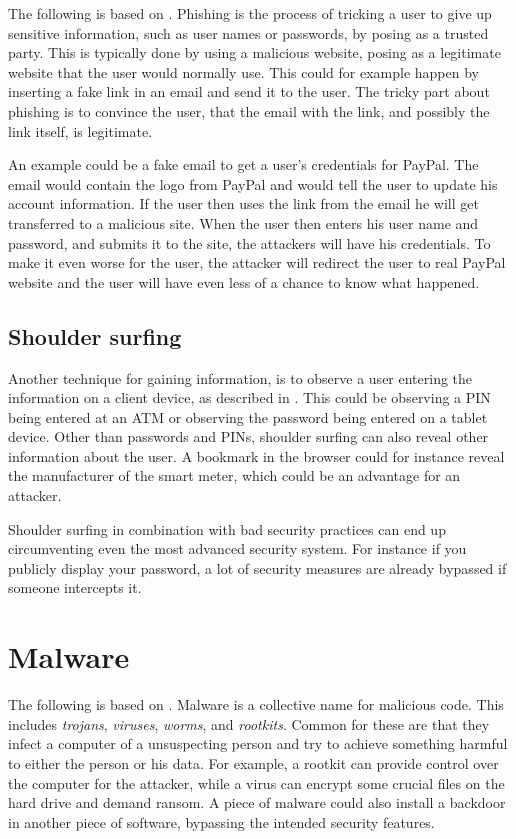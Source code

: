 The following is based on \citet{security_engineering_ross_anderson,dhamija2006phishing}.
Phishing is the process of tricking a user to give up sensitive information, such as user names or passwords, by posing as a trusted party.
This is typically done by using a malicious website, posing as a legitimate website that the user would normally use.
This could for example happen by inserting a fake link in an email and send it to the user.
The tricky part about phishing is to convince the user, that the email with the link, and possibly the link itself, is legitimate.

An example could be a fake email to get a user's credentials for PayPal.
The email would contain the logo from PayPal and would tell the user to update his account information.
If the user then uses the link from the email he will get transferred to a malicious site.
When the user then enters his user name and password, and submits it to the site, the attackers will have his credentials.
To make it even worse for the user, the attacker will redirect the user to real PayPal website and the user will have even less of a chance to know what happened.

\subsection{Shoulder surfing}\label{attack:shoulder}
Another technique for gaining information, is to observe a user entering the information on a client device, as described in \citet{notechhack}.
This could be observing a PIN being entered at an ATM or observing the password being entered on a tablet device.
Other than passwords and PINs, shoulder surfing can also reveal other information about the user.
A bookmark in the browser could for instance reveal the manufacturer of the smart meter, which could be an advantage for an attacker.

Shoulder surfing in combination with bad security practices can end up circumventing even the most advanced security system.
For instance if you publicly display your password, a lot of security measures are already bypassed if someone intercepts it.

\section{Malware}\label{attack:malware}
The following is based on \citet[p.~644]{security_engineering_ross_anderson}.
Malware is a collective name for malicious code. 
This includes \emph{trojans}, \emph{viruses}, \emph{worms}, and \emph{rootkits}.
Common for these are that they infect a computer of a unsuspecting person and try to achieve something harmful to either the person or his data.
For example, a rootkit can provide control over the computer for the attacker, while a virus can encrypt some crucial files on the hard drive and demand ransom.
A piece of malware could also install a backdoor in another piece of software, bypassing the intended security features.

